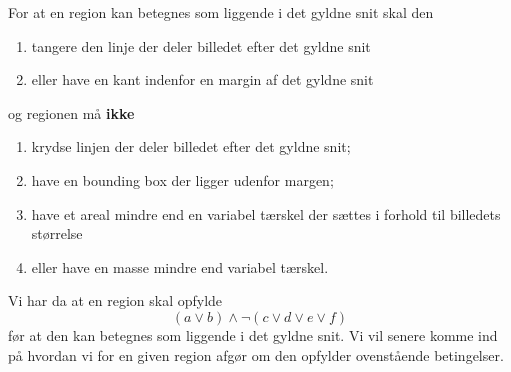 {For at en region kan betegnes som liggende i det gyldne snit skal den
\begin{enumerate}
	\renewcommand{\labelenumi}{(\alph{enumi})}
	\item tangere den linje der deler billedet efter det gyldne snit
	\item eller have en kant indenfor en margin af det gyldne snit
\end{enumerate}
og regionen må \textbf{ikke}
\begin{enumerate}
	\renewcommand{\labelenumi}{(\alph{enumi})}
	\setcounter{enumi}{2}
	\item krydse linjen der deler billedet efter det gyldne snit;
	\item have en bounding box der ligger udenfor margen;
	\item have et areal mindre end en variabel tærskel der sættes i
		forhold til billedets størrelse
	\item eller have en masse mindre end variabel tærskel.
\end{enumerate}
Vi har da at en region skal opfylde
\begin{equation}
	(a \vee b) \wedge \neg (c \vee d \vee e \vee f)
\end{equation}
før at den kan betegnes som liggende i det gyldne snit. Vi vil senere
komme ind på hvordan vi for en given region afgør om den opfylder
ovenstående betingelser.

}


